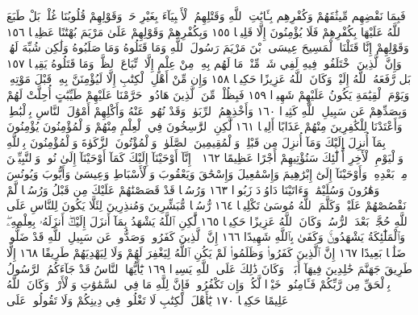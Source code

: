 فَبِمَا نَقْضِهِم مِّيثَٰقَهُمْ وَكُفْرِهِم بِـَٔايَٰتِ ٱللَّهِ وَقَتْلِهِمُ ٱلْأَنۢبِيَآءَ
بِغَيْرِ حَقࣲّ وَقَوْلِهِمْ قُلُوبُنَا غُلْفُۢۚ بَلْ طَبَعَ ٱللَّهُ عَلَيْهَا بِكُفْرِهِمْ
فَلَا يُؤْمِنُونَ إِلَّا قَلِيلࣰا ١٥٥ وَبِكُفْرِهِمْ وَقَوْلِهِمْ عَلَىٰ مَرْيَمَ بُهْتَٰنًا
عَظِيمࣰا ١٥٦ وَقَوْلِهِمْ إِنَّا قَتَلْنَا ٱلْمَسِيحَ عِيسَى ٱبْنَ مَرْيَمَ رَسُولَ
ٱللَّهِ وَمَا قَتَلُوهُ وَمَا صَلَبُوهُ وَلَٰكِن شُبِّهَ لَهُمْۚ وَإِنَّ ٱلَّذِينَ
ٱخْتَلَفُوا۟ فِيهِ لَفِي شَكࣲّ مِّنْهُۚ مَا لَهُم بِهِۦ مِنْ عِلْمٍ إِلَّا ٱتِّبَاعَ ٱلظَّنِّۚ
وَمَا قَتَلُوهُ يَقِينَۢا ١٥٧ بَل رَّفَعَهُ ٱللَّهُ إِلَيْهِۚ وَكَانَ ٱللَّهُ عَزِيزًا حَكِيمࣰا ١٥٨
وَإِن مِّنْ أَهْلِ ٱلْكِتَٰبِ إِلَّا لَيُؤْمِنَنَّ بِهِۦ قَبْلَ مَوْتِهِۦۖ وَيَوْمَ
ٱلْقِيَٰمَةِ يَكُونُ عَلَيْهِمْ شَهِيدࣰا ١٥٩ فَبِظُلْمࣲ مِّنَ ٱلَّذِينَ هَادُوا۟
حَرَّمْنَا عَلَيْهِمْ طَيِّبَٰتٍ أُحِلَّتْ لَهُمْ وَبِصَدِّهِمْ عَن سَبِيلِ ٱللَّهِ
كَثِيرࣰا ١٦٠ وَأَخْذِهِمُ ٱلرِّبَوٰا۟ وَقَدْ نُهُوا۟ عَنْهُ وَأَكْلِهِمْ أَمْوَٰلَ
ٱلنَّاسِ بِٱلْبَٰطِلِۚ وَأَعْتَدْنَا لِلْكَٰفِرِينَ مِنْهُمْ عَذَابًا أَلِيمࣰا ١٦١ لَّٰكِنِ
ٱلرَّٰسِخُونَ فِي ٱلْعِلْمِ مِنْهُمْ وَٱلْمُؤْمِنُونَ يُؤْمِنُونَ بِمَآ أُنزِلَ إِلَيْكَ
وَمَآ أُنزِلَ مِن قَبْلِكَۚ وَٱلْمُقِيمِينَ ٱلصَّلَوٰةَۚ وَٱلْمُؤْتُونَ ٱلزَّكَوٰةَ
وَٱلْمُؤْمِنُونَ بِٱللَّهِ وَٱلْيَوْمِ ٱلْأٓخِرِ أُو۟لَٰٓئِكَ سَنُؤْتِيهِمْ أَجْرًا عَظِيمًا ١٦٢
۞ إِنَّآ أَوْحَيْنَآ إِلَيْكَ كَمَآ أَوْحَيْنَآ إِلَىٰ نُوحࣲ وَٱلنَّبِيِّـۧنَ مِنۢ بَعْدِهِۦۚ
وَأَوْحَيْنَآ إِلَىٰٓ إِبْرَٰهِيمَ وَإِسْمَٰعِيلَ وَإِسْحَٰقَ وَيَعْقُوبَ
وَٱلْأَسْبَاطِ وَعِيسَىٰ وَأَيُّوبَ وَيُونُسَ وَهَٰرُونَ وَسُلَيْمَٰنَۚ
وَءَاتَيْنَا دَاوُۥدَ زَبُورࣰا ١٦٣ وَرُسُلࣰا قَدْ قَصَصْنَٰهُمْ عَلَيْكَ
مِن قَبْلُ وَرُسُلࣰا لَّمْ نَقْصُصْهُمْ عَلَيْكَۚ وَكَلَّمَ ٱللَّهُ مُوسَىٰ
تَكْلِيمࣰا ١٦٤ رُّسُلࣰا مُّبَشِّرِينَ وَمُنذِرِينَ لِئَلَّا يَكُونَ لِلنَّاسِ
عَلَى ٱللَّهِ حُجَّةُۢ بَعْدَ ٱلرُّسُلِۚ وَكَانَ ٱللَّهُ عَزِيزًا حَكِيمࣰا ١٦٥
لَّٰكِنِ ٱللَّهُ يَشْهَدُ بِمَآ أَنزَلَ إِلَيْكَۖ أَنزَلَهُۥ بِعِلْمِهِۦۖ وَٱلْمَلَٰٓئِكَةُ
يَشْهَدُونَۚ وَكَفَىٰ بِٱللَّهِ شَهِيدًا ١٦٦ إِنَّ ٱلَّذِينَ كَفَرُوا۟
وَصَدُّوا۟ عَن سَبِيلِ ٱللَّهِ قَدْ ضَلُّوا۟ ضَلَٰلَۢا بَعِيدًا ١٦٧ إِنَّ ٱلَّذِينَ
كَفَرُوا۟ وَظَلَمُوا۟ لَمْ يَكُنِ ٱللَّهُ لِيَغْفِرَ لَهُمْ وَلَا لِيَهْدِيَهُمْ
طَرِيقًا ١٦٨ إِلَّا طَرِيقَ جَهَنَّمَ خَٰلِدِينَ فِيهَآ أَبَدࣰاۚ وَكَانَ
ذَٰلِكَ عَلَى ٱللَّهِ يَسِيرࣰا ١٦٩ يَٰٓأَيُّهَا ٱلنَّاسُ قَدْ جَآءَكُمُ ٱلرَّسُولُ بِٱلْحَقِّ
مِن رَّبِّكُمْ فَـَٔامِنُوا۟ خَيْرࣰا لَّكُمْۚ وَإِن تَكْفُرُوا۟ فَإِنَّ لِلَّهِ
مَا فِي ٱلسَّمَٰوَٰتِ وَٱلْأَرْضِۚ وَكَانَ ٱللَّهُ عَلِيمًا حَكِيمࣰا ١٧٠
يَٰٓأَهْلَ ٱلْكِتَٰبِ لَا تَغْلُوا۟ فِي دِينِكُمْ وَلَا تَقُولُوا۟ عَلَى
